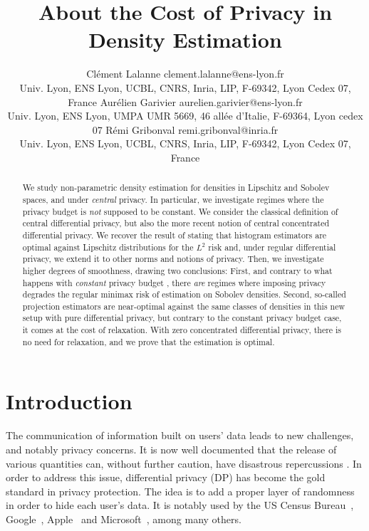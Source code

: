 \documentclass[10pt]{article} %
\title{About the Cost of \B{Central} Privacy in Density Estimation}
\author{{%
 \name Clément Lalanne \email clement.lalanne@ens-lyon.fr \\
 \addr Univ. Lyon, ENS Lyon, UCBL, CNRS, Inria,  LIP, F-69342, Lyon Cedex 07, France
 \AND
 \name Aurélien Garivier \email aurelien.garivier@ens-lyon.fr \\
 \addr Univ. Lyon, ENS Lyon, UMPA UMR 5669, 46 allée d'Italie, F-69364, Lyon cedex 07%
 \AND
 \name Rémi Gribonval \email remi.gribonval@inria.fr\\
 \addr Univ. Lyon, ENS Lyon, UCBL, CNRS, Inria,  LIP, F-69342, Lyon Cedex 07, France%
}}
\newcommand\CL[1]{\textcolor{blue}{#1}}
\newcommand\B[1]{{#1}}
\begin{document}
\maketitle

\begin{abstract}%
  We study non-parametric density estimation for densities in Lipschitz and Sobolev spaces, and under \emph{\B{central}} privacy. In particular, we investigate regimes where the privacy budget is \emph{not} supposed to be constant. We consider the classical definition of \B{central} differential privacy, but also the more recent notion of \B{central} concentrated differential privacy. We recover the result of \citet{barber2014privacy} stating that histogram estimators are optimal against Lipschitz distributions for the $L^2$ risk and, under regular differential privacy, we extend it to other norms and notions of privacy. Then, we investigate higher degrees of smoothness, drawing two conclusions: First, and contrary to what happens with \emph{constant} privacy budget \citep{wasserman2010statistical}, there \emph{are} regimes where imposing privacy degrades the regular minimax risk of estimation on Sobolev densities. Second, so-called projection estimators are near-optimal against the same classes of densities in this new setup with pure differential privacy, but contrary to the constant privacy budget case, it comes at the cost of relaxation. With zero concentrated differential privacy, there is no need for relaxation, and we prove that the estimation is optimal.
\end{abstract}


\section{Introduction}

The communication of information built on users' data leads to new challenges, and notably privacy concerns. It is now well documented that the release of various quantities can, without further caution, have disastrous repercussions \citep{narayanan2006break,backstrom2007wherefore,fredrikson2015model,dinur2003revealing,homer2008resolving,loukides2010disclosure,narayanan2008robust,sweeney2000simple,gonon2023sparsity,wagner2018technical,sweeney2002k}.
In order to address this issue, differential privacy (DP) \citep{dwork2006calibrating} has become the gold standard in privacy protection. The idea is to add a proper layer of randomness %
in order to hide each user's data. It is notably used by the US Census Bureau~\citep{abowd2018us}, Google~\citep{erlingsson2014rappor}, Apple~\citep{thakurta2017learning} and Microsoft~\citep{ding2017collecting}, among many others. 
\end{document}
